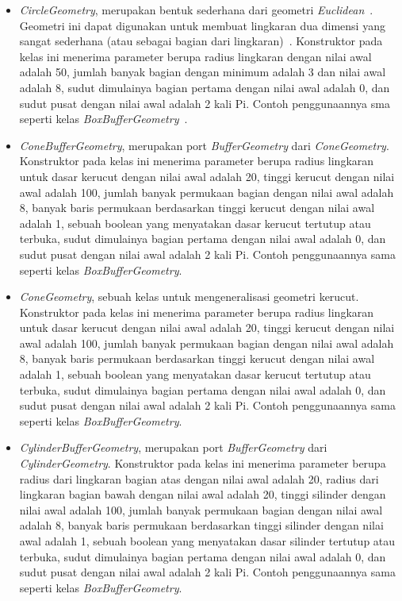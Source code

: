 \begin{itemize}
\begin{itemize}
		\item {\it CircleGeometry}, merupakan bentuk sederhana dari geometri {\it Euclidean}~\cite{threejs}. Geometri ini dapat digunakan untuk membuat lingkaran dua dimensi yang sangat sederhana (atau sebagai bagian dari lingkaran)~\cite{learningThreejs}. Konstruktor pada kelas ini menerima parameter berupa radius lingkaran dengan nilai awal adalah 50, jumlah banyak bagian dengan minimum adalah 3 dan nilai awal adalah 8, sudut dimulainya bagian pertama dengan nilai awal adalah 0, dan sudut pusat dengan nilai awal adalah 2 kali Pi. Contoh penggunaannya sma seperti kelas {\it BoxBufferGeometry}~\cite{threejs}.
		\item {\it ConeBufferGeometry}, merupakan port {\it BufferGeometry} dari {\it ConeGeometry}. Konstruktor pada kelas ini menerima parameter berupa radius lingkaran untuk dasar kerucut dengan nilai awal adalah 20, tinggi kerucut dengan nilai awal adalah 100, jumlah banyak permukaan bagian dengan nilai awal adalah 8, banyak baris permukaan berdasarkan tinggi kerucut dengan nilai awal adalah 1, sebuah boolean yang menyatakan dasar kerucut tertutup atau terbuka, sudut dimulainya bagian pertama dengan nilai awal adalah 0, dan sudut pusat dengan nilai awal adalah 2 kali Pi. Contoh penggunaannya sama seperti kelas {\it BoxBufferGeometry}.
		\item {\it ConeGeometry}, sebuah kelas untuk mengeneralisasi geometri kerucut. Konstruktor pada kelas ini menerima parameter berupa radius lingkaran untuk dasar kerucut dengan nilai awal adalah 20, tinggi kerucut dengan nilai awal adalah 100, jumlah banyak permukaan bagian dengan nilai awal adalah 8, banyak baris permukaan berdasarkan tinggi kerucut dengan nilai awal adalah 1, sebuah boolean yang menyatakan dasar kerucut tertutup atau terbuka, sudut dimulainya bagian pertama dengan nilai awal adalah 0, dan sudut pusat dengan nilai awal adalah 2 kali Pi. Contoh penggunaannya sama seperti kelas {\it BoxBufferGeometry}.
		\item {\it CylinderBufferGeometry}, merupakan port {\it BufferGeometry} dari {\it CylinderGeometry}. Konstruktor pada kelas ini menerima parameter berupa radius dari lingkaran bagian atas dengan nilai awal adalah 20, radius dari lingkaran bagian bawah dengan nilai awal adalah 20, tinggi silinder dengan nilai awal adalah 100, jumlah banyak permukaan bagian dengan nilai awal adalah 8, banyak baris permukaan berdasarkan tinggi silinder dengan nilai awal adalah 1, sebuah boolean yang menyatakan dasar silinder tertutup atau terbuka, sudut dimulainya bagian pertama dengan nilai awal adalah 0, dan sudut pusat dengan nilai awal adalah 2 kali Pi. Contoh penggunaannya sama seperti kelas {\it BoxBufferGeometry}.

\end{itemize}
\end{itemize}
